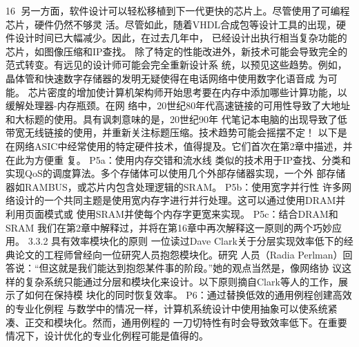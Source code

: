                                                   16
另一方面，软件设计可以轻松移植到下一代更快的芯片上。尽管使用了可编程芯片，硬件仍然不够灵
活。尽管如此，随着VHDL合成包等设计工具的出现，硬件设计时间已大幅减少。因此，在过去几年中，
已经设计出执行相当复杂功能的芯片，如图像压缩和IP查找。
除了特定的性能改进外，新技术可能会导致完全的范式转变。有远见的设计师可能会完全重新设计系
统，以预见这些趋势。例如，晶体管和快速数字存储器的发明无疑使得在电话网络中使用数字化语音成
为可能。
芯片密度的增加使计算机架构师开始思考要在内存中添加哪些计算功能，以缓解处理器-内存瓶颈。在网
络中，20世纪80年代高速链接的可用性导致了大地址和大标题的使用。具有讽刺意味的是，20世纪90年
代笔记本电脑的出现导致了低带宽无线链接的使用，并重新关注标题压缩。技术趋势可能会摇摆不定！
以下是在网络ASIC中经常使用的特定硬件技术，值得提及。它们首次在第2章中描述，并在此为方便重
复。
P5a：使用内存交错和流水线
类似的技术用于IP查找、分类和实现QoS的调度算法。多个存储体可以使用几个外部存储器实现，一个外
部存储器如RAMBUS，或芯片内包含处理逻辑的SRAM。
P5b：使用宽字并行性
许多网络设计的一个共同主题是使用宽内存字进行并行处理。这可以通过使用DRAM并利用页面模式或
使用SRAM并使每个内存字更宽来实现。
P5c：结合DRAM和SRAM
我们在第2章中解释过，并将在第16章中再次解释这一原则的两个巧妙应用。
3.3.2 具有效率模块化的原则
一位读过Dave Clark关于分层实现效率低下的经典论文的工程师曾经向一位研究人员抱怨模块化。研究
人员（Radia Perlman）回答说：“但这就是我们能达到抱怨某件事的阶段。”她的观点当然是，像网络协
议这样的复杂系统只能通过分层和模块化来设计。以下原则摘自Clark等人的工作，展示了如何在保持模
块化的同时恢复效率。
P6：通过替换低效的通用例程创建高效的专业化例程
与数学中的情况一样，计算机系统设计中使用抽象可以使系统紧凑、正交和模块化。然而，通用例程的
一刀切特性有时会导致效率低下。在重要情况下，设计优化的专业化例程可能是值得的。

